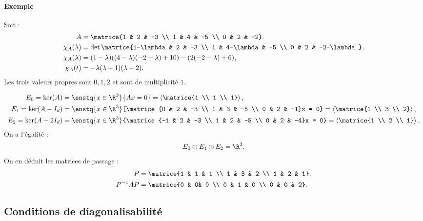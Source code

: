 \documentclass{mybourbaki}
\begin{document}
\paragraph{Exemple}Soit :
\begin{align*}
A &= \matrice{1 & 2 & -3 \\ 1 & 4 & -5 \\ 0 & 2 & -2}.\\
\chi_A(\lambda) &= \det\matrice{1-\lambda & 2 & -3 \\ 1 & 4-\lambda & -5 \\ 0 & 2 & -2-\lambda},\\
\chi_A(\lambda) &= (1-\lambda)((4-\lambda)(-2-\lambda)+10) - (2(-2-\lambda)+6),\\
\chi_A(t) &= -\lambda(\lambda-1)(\lambda-2).
\end{align*}
Les trois valeurs propres sont $0,1,2$ et sont de multiplicité $1$.

\begin{align*}
E_0 = \ker (A) &= \enstq{x\in \R^{3}}{Ax = 0} = \left\langle \matrice{1 \\ 1 \\ 1}\right\rangle,\\
E_1 = \ker (A-I_d) &= \enstq{x\in \R^{3}}{\matrice{0 & 2 & -3 \\ 1 & 3 & -5 \\ 0 & 2 & -1}x = 0} =\left\langle\matrice{1 \\ 3 \\ 2} \right\rangle,\\
E_2 = \ker(A-2I_d) &= \enstq{x\in \R^{3}}{\matrice{-1 & 2 & -3 \\ 1 & 2 & -5 \\ 0 & 2 & -4}x = 0} = \left\langle \matrice{1 \\ 2 \\ 1}\right\rangle.
\end{align*}
On a l'égalité : \[ E_0 \oplus E_1 \oplus E_2 = \R^{3}.\]
On en déduit les matrices de passage : 
\begin{align*}
P &= \matrice{1 & 1 & 1 \\ 1 & 3 & 2 \\ 1 & 2 & 1}, \\
P^{-1}AP &= \matrice{0 & 0& 0 \\ 0 & 1 & 0 \\ 0 & 0 & 2}.
\end{align*}
\subsection{Conditions de diagonalisabilité}
\end{document}
